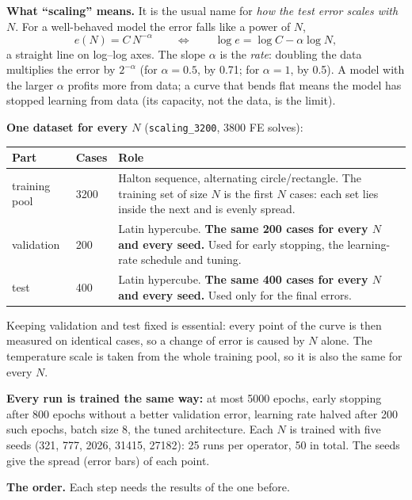 \documentclass[11pt,a4paper]{article}
\newcommand{\code}[1]{\lstinline{#1}}
\begin{document}
\textbf{What ``scaling'' means.} It is the usual name for \emph{how the test error scales with
$N$}. For a well-behaved model the error falls like a power of $N$,
\[
  e(N) = C\,N^{-\alpha}
  \qquad\Longleftrightarrow\qquad
  \log e = \log C - \alpha \log N ,
\]
a straight line on log--log axes. The slope $\alpha$ is the \emph{rate}: doubling the data
multiplies the error by $2^{-\alpha}$ (for $\alpha = 0.5$, by 0.71; for $\alpha = 1$, by 0.5).
A model with the larger $\alpha$ profits more from data; a curve that bends flat means the model
has stopped learning from data (its capacity, not the data, is the limit).

\textbf{One dataset for every $N$} (\code{scaling_3200}, 3800 FE solves):
\begin{center}
\begin{tabularx}{\textwidth}{@{}llY@{}}
\toprule
Part & Cases & Role \\
\midrule
training pool & 3200 & Halton sequence, alternating circle/rectangle. The training set of size $N$
                        is the first $N$ cases: each set lies inside the next and is evenly spread. \\
validation    & 200  & Latin hypercube. \textbf{The same 200 cases for every $N$ and every seed.}
                        Used for early stopping, the learning-rate schedule and tuning. \\
test          & 400  & Latin hypercube. \textbf{The same 400 cases for every $N$ and every seed.}
                        Used only for the final errors. \\
\bottomrule
\end{tabularx}
\end{center}
Keeping validation and test fixed is essential: every point of the curve is then measured on
identical cases, so a change of error is caused by $N$ alone. The temperature scale is taken from
the whole training pool, so it is also the same for every $N$.

\textbf{Every run is trained the same way:} at most 5000 epochs, early stopping after 800 epochs
without a better validation error, learning rate halved after 200 such epochs, batch size 8, the
tuned architecture. Each $N$ is trained with five seeds (321, 777, 2026, 31415, 27182): 25 runs per
operator, 50 in total. The seeds give the spread (error bars) of each point.

\textbf{The order.} Each step needs the results of the one before.
\end{document}
